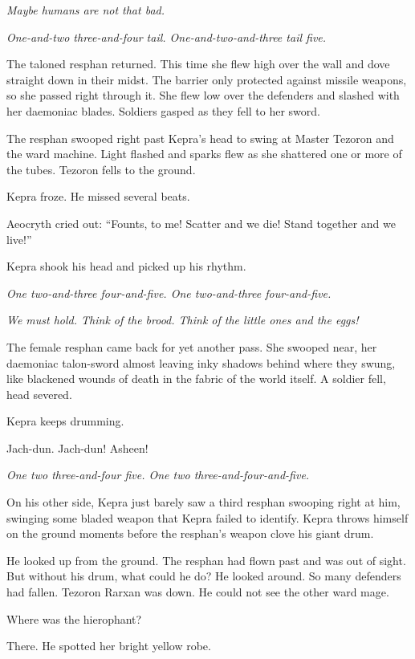 \documentclass
  [a4paper,
   12pt,
   oneside
  ]%
  {article}
\newcommand{\drum}[1]{\textsl{#1}}
\begin{document}
\emph{Maybe humans are not that bad.}

\drum{One-and-two three-and-four \emph{tail}. One-and-two-and-three \emph{tail} five.}

The taloned resphan returned. This time she flew high over the wall and dove straight down in their midst. 
The barrier only protected against missile weapons, so she passed right through it. 
She flew low over the defenders and slashed with her daemoniac blades. 
Soldiers gasped as they fell to her sword.

The resphan swooped right past Kepra’s head to swing at Master Tezoron and the ward machine. 
Light flashed and sparks flew as she shattered one or more of the tubes. 
Tezoron fells to the ground. 

Kepra froze. He missed several beats. 

Aeocryth cried out: 
``Founts, to me! Scatter and we die! Stand together and we live!'' 

Kepra shook his head and picked up his rhythm. 

\drum{One two-and-three four-and-five. One two-and-three four-and-five.}

\emph{We must hold. Think of the brood. Think of the little ones and the eggs!}

The female resphan came back for yet another pass. She swooped near, her daemoniac talon-sword almost leaving inky shadows behind where they swung, like blackened wounds of death in the fabric of the world itself. 
A soldier fell, head severed. 

Kepra keeps drumming. 

Jach-dun. Jach-dun! Asheen!

\drum{One two three-and-four five. One two three-and-four-and-five.}

On his other side, Kepra just barely saw a third resphan swooping right at him, swinging some bladed weapon that Kepra failed to identify. Kepra throws himself on the ground moments before the resphan's weapon clove his giant drum. 

He looked up from the ground. 
The resphan had flown past and was out of sight. 
But without his drum, what could he do? 
He looked around. So many defenders had fallen. Tezoron Rarxan was down. He could not see the other ward mage. 

Where was the hierophant? 

There. He spotted her bright yellow robe. 
\end{document}
